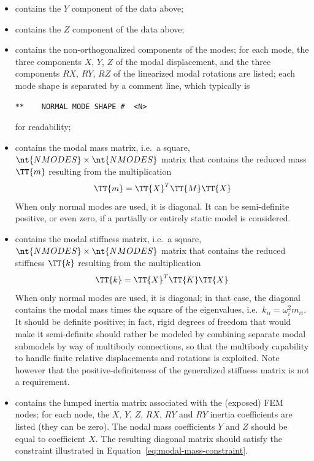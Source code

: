 \begin{itemize}
\item {} contains the $Y$ component of the data above;

\item {} contains the $Z$ component of the data above;

\item {} contains the non-orthogonalized components 
of the  modes; for each mode, the three components 
$X$, $Y$, $Z$ of the modal displacement, and the three components
$RX$, $RY$, $RZ$ of the linearized modal rotations are listed;
each mode shape is separated by a comment line, which typically is
\begin{verbatim}
**    NORMAL MODE SHAPE #  <N>
\end{verbatim}
for readability;

\item {} contains the modal mass matrix,
i.e.\ a square, $\nt{NMODES} \times \nt{NMODES}$ matrix that contains
the reduced mass
$\TT{m}$
resulting from the multiplication
\begin{equation}
	\label{eq:modal-mass-constraint}
	\TT{m} = \TT{X}^T \TT{M} \TT{X}
\end{equation}
When only normal modes are used, it is diagonal.
It can be semi-definite positive, or even zero, if a partially 
or entirely static model is considered.

\item {} contains the modal stiffness matrix,
i.e.\ a square, $\nt{NMODES} \times \nt{NMODES}$ matrix that contains
the reduced stiffness
$\TT{k}$
resulting from the multiplication
\begin{equation}
	\TT{k} = \TT{X}^T \TT{K} \TT{X}
\end{equation}
When only normal modes are used, it is diagonal; in that case,
the diagonal contains the modal mass times the square 
of the eigenvalues, i.e.\ $k_{ii} = \omega_i^2 m_{ii}$.
It should be definite positive; in fact, rigid degrees of freedom
that would make it semi-definite should rather be modeled by combining
separate modal submodels by way of multibody connections, so that
the multibody capability to handle finite relative displacements
and rotations is exploited.
Note however that the positive-definiteness of the generalized
stiffness matrix is not a requirement.

\item {} contains the lumped inertia matrix
associated with the  (exposed) FEM nodes;
for each node, the $X$, $Y$, $Z$, $RX$, $RY$ and $RY$ inertia
coefficients are listed (they can be zero).
The nodal mass coefficients $Y$ and $Z$ should be equal
to coefficient $X$.
The resulting diagonal matrix should satisfy the constraint
illustrated in Equation~\ref{eq:modal-mass-constraint}.


\end{itemize}
